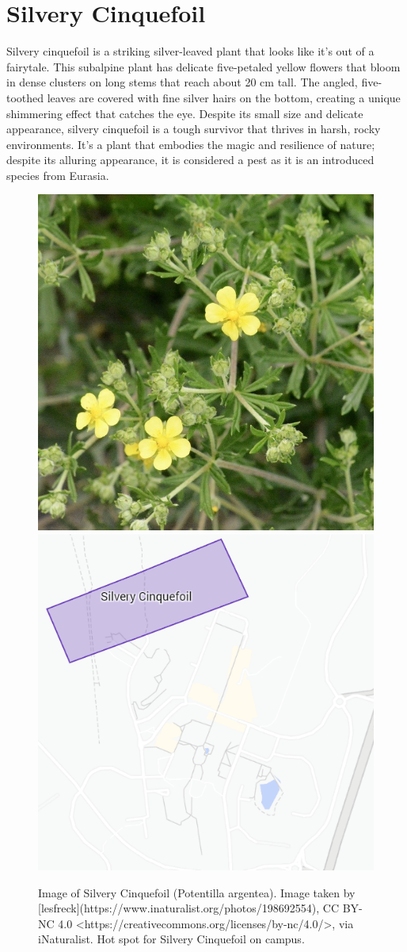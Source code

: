 \documentclass[
]{book}
\begin{document}
\hypertarget{silvery-cinquefoil}{%
\section{Silvery Cinquefoil}\label{silvery-cinquefoil}}

Silvery cinquefoil is a striking silver-leaved plant that looks like it's out of a fairytale. This subalpine plant has delicate five-petaled yellow flowers that bloom in dense clusters on long stems that reach about 20 cm tall. The angled, five-toothed leaves are covered with fine silver hairs on the bottom, creating a unique shimmering effect that catches the eye. Despite its small size and delicate appearance, silvery cinquefoil is a tough survivor that thrives in harsh, rocky environments. It's a plant that embodies the magic and resilience of nature; despite its alluring appearance, it is considered a pest as it is an introduced species from Eurasia.

\begin{figure}

{\centering \includegraphics[width=0.49\linewidth,height=0.2\textheight]{plant_images/silvery_cinq_11} \includegraphics[width=0.49\linewidth,height=0.2\textheight]{plant_images/silveryconquefoil_hotspot_11} 

}

\caption{Image of Silvery Cinquefoil (Potentilla argentea). Image taken by [lesfreck](https://www.inaturalist.org/photos/198692554), CC BY-NC 4.0 <https://creativecommons.org/licenses/by-nc/4.0/>, via iNaturalist. Hot spot for Silvery Cinquefoil on campus.}\label{fig:unnamed-chunk-8}
\end{figure}
\end{document}
